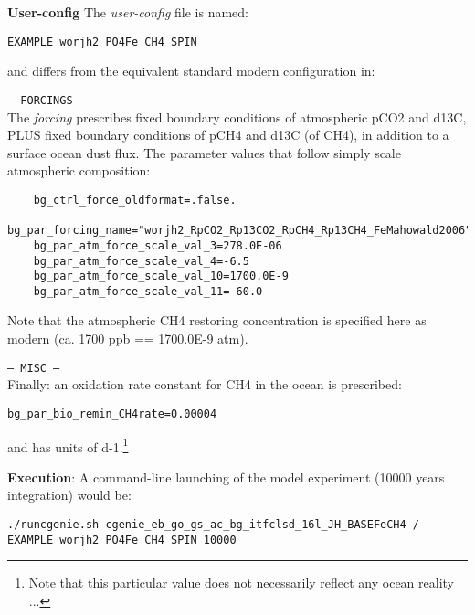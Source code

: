 \documentclass[10pt,twoside]{article}
\begin{document}
\noindent \textbf{User-config} The \textit{user-config} file is named:
\vspace{-10pt}\begin{verbatim}EXAMPLE_worjh2_PO4Fe_CH4_SPIN\end{verbatim}\vspace{-10pt}
and differs from the equivalent standard modern configuration in:
\begin{compactitem}
	
	\item \texttt{--- FORCINGS ---}
	\\ The \textit{forcing} prescribes fixed boundary conditions of atmospheric pCO2 and d13C, PLUS fixed boundary conditions of pCH4 and d13C (of CH4), in addition to a surface ocean dust flux.
	The parameter values that follow simply scale atmospheric composition:
	\vspace{-5pt}\begin{verbatim}
	bg_ctrl_force_oldformat=.false.
	bg_par_forcing_name="worjh2_RpCO2_Rp13CO2_RpCH4_Rp13CH4_FeMahowald2006"
	bg_par_atm_force_scale_val_3=278.0E-06
	bg_par_atm_force_scale_val_4=-6.5
	bg_par_atm_force_scale_val_10=1700.0E-9
	bg_par_atm_force_scale_val_11=-60.0
	\end{verbatim}\vspace{-5pt}
	Note that the atmospheric CH4 restoring concentration is specified here as modern (ca. 1700 ppb == 1700.0E-9 atm).
		
	\item \texttt{--- MISC ---}
	\\ Finally: an oxidation rate constant for CH4 in the ocean is prescribed:
	\vspace{-5pt}\begin{verbatim}bg_par_bio_remin_CH4rate=0.00004\end{verbatim}\vspace{-5pt}
	and has units of d-1.\footnote{Note that this particular value does not necessarily reflect any ocean reality ...}

\end{compactitem}

\noindent \textbf{Execution}: A command-line launching of the model experiment (10000 years integration) would be:
\vspace{-10pt}\begin{verbatim}./runcgenie.sh cgenie_eb_go_gs_ac_bg_itfclsd_16l_JH_BASEFeCH4 /
EXAMPLE_worjh2_PO4Fe_CH4_SPIN 10000\end{verbatim}\vspace{-5pt}
\end{document}
